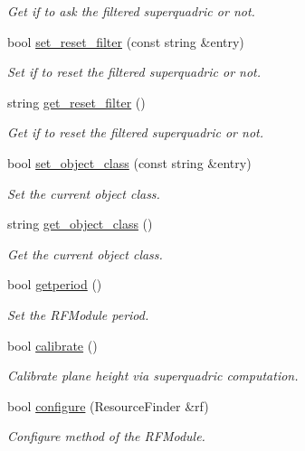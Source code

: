 \begin{DoxyCompactItemize}
\begin{DoxyCompactList}\small\item\em Get if to ask the filtered superquadric or not. \end{DoxyCompactList}\item 
bool \hyperlink{classGraspDemo_a491b6098d6ca65dd3cc5223e50ffb86a}{set\+\_\+reset\+\_\+filter} (const string \&entry)
\begin{DoxyCompactList}\small\item\em Set if to reset the filtered superquadric or not. \end{DoxyCompactList}\item 
string \hyperlink{classGraspDemo_ad86eaf31952318292e312051f547b18e}{get\+\_\+reset\+\_\+filter} ()
\begin{DoxyCompactList}\small\item\em Get if to reset the filtered superquadric or not. \end{DoxyCompactList}\item 
bool \hyperlink{classGraspDemo_a87b1af09ff3b37342e5d8d4684167c06}{set\+\_\+object\+\_\+class} (const string \&entry)
\begin{DoxyCompactList}\small\item\em Set the current object class. \end{DoxyCompactList}\item 
string \hyperlink{classGraspDemo_abae15028a7341b468dd12e7d6f84b31c}{get\+\_\+object\+\_\+class} ()
\begin{DoxyCompactList}\small\item\em Get the current object class. \end{DoxyCompactList}\item 
bool \hyperlink{classGraspDemo_a86a475f7c16f2c70d486bf6a38dbb547}{getperiod} ()
\begin{DoxyCompactList}\small\item\em Set the R\+F\+Module period. \end{DoxyCompactList}\item 
bool \hyperlink{classGraspDemo_a1530446b0bb96c1c2b43be52f61cc9b4}{calibrate} ()
\begin{DoxyCompactList}\small\item\em Calibrate plane height via superquadric computation. \end{DoxyCompactList}\item 
bool \hyperlink{classGraspDemo_a13a8d5d06b3cedbd4025237ffbe1e7b3}{configure} (Resource\+Finder \&rf)
\begin{DoxyCompactList}\small\item\em Configure method of the R\+F\+Module. \end{DoxyCompactList}\item 

\end{DoxyCompactItemize}
